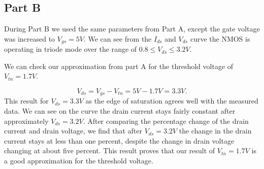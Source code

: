 		\subsection{Part B}
		During Part B we used the same parameters from Part A, except the gate voltage was increased to $V_{gs} = 5V$. 
		We can see from the $I_{ds}$ and $V_{ds}$ curve the NMOS is operating in triode mode over the range of $0.8 \le V_{ds} \le 3.2V$.

		We can check our approximation from part A for the threshold voltage of $V_{tn} = 1.7 V$.
		
\begin{equation}
	\label{eq:thresh_5V}
		V_{ds} = V_{gs} - V_{tn} = 5 V - 1.7 V = 3.3 V.	
\end{equation}
This result for $V_{ds} = 3.3 V$ as the edge of saturation agrees well with the measured data. 
We can see on the curve the drain current stays fairly constant after approximately $V_{ds}=3.2 V$.
After comparing the percentage change of the drain current and drain voltage, we find that after $V_{ds} = 3.2 V$ the change in the drain current stays at less than one percent, despite the change in drain voltage changing at about five percent. 
This result proves that our result of $V_{tn} = 1.7 V$ is a good approximation for the threshold voltage.
